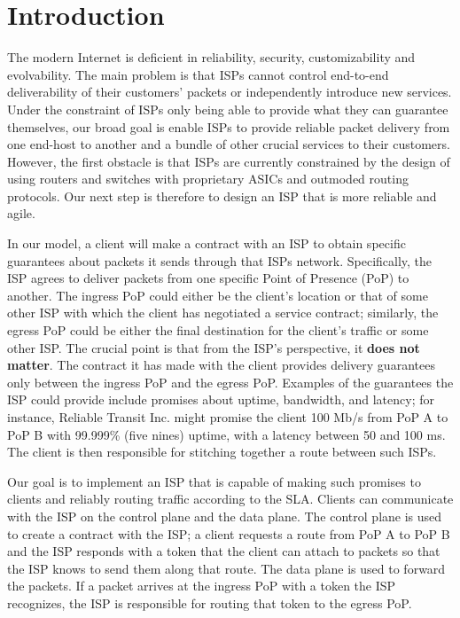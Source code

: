 \documentclass{article}
\begin{document}
\section{Introduction}

The modern Internet is deficient in reliability, security,
customizability and evolvability. The main problem is that ISPs cannot
control end-to-end deliverability of their customers' packets or
independently introduce new services. Under the constraint of ISPs
only being able to provide what they can guarantee themselves, our
broad goal is enable ISPs to provide reliable packet delivery from one
end-host to another and a bundle of other crucial services to their
customers. However, the first obstacle is that ISPs are currently
constrained by the design of using routers and switches with
proprietary ASICs and outmoded routing protocols. Our next step is
therefore to design an ISP that is more reliable and agile.

In our model, a client will make a contract with an ISP to obtain
specific guarantees about packets it sends through that ISPs
network. Specifically, the ISP agrees to deliver packets from one
specific Point of Presence (PoP) to another. The ingress PoP could
either be the client's location or that of some other ISP with which
the client has negotiated a service contract; similarly, the egress
PoP could be either the final destination for the client's traffic or
some other ISP. The crucial point is that from the ISP's perspective,
it \textbf{does not matter}. The contract it has made with the client
provides delivery guarantees only between the ingress PoP and the
egress PoP. Examples of the guarantees the ISP could provide include
promises about uptime, bandwidth, and latency; for instance, Reliable
Transit Inc. might promise the client 100 Mb/s from PoP A to PoP B
with 99.999\% (five nines) uptime, with a latency between 50 and 100
ms. The client is then responsible for stitching together a route
between such ISPs.

Our goal is to implement an ISP that is capable of making such
promises to clients and reliably routing traffic according to the SLA. Clients can
communicate with the ISP on the control plane and the data plane. The
control plane is used to create a contract with the ISP; a client
requests a route from PoP A to PoP B and the ISP responds with a token
that the client can attach to packets so that the ISP knows to send
them along that route. The data plane is used to forward the
packets. If a packet arrives at the ingress PoP with a token the ISP
recognizes, the ISP is responsible for routing that token to the
egress PoP.
\end{document}
